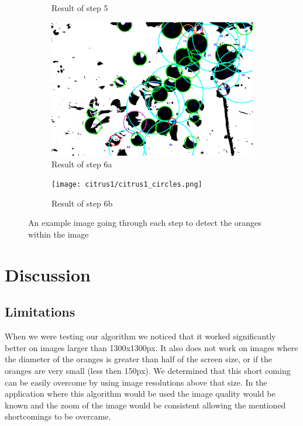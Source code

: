 \documentclass[conference]{IEEEtran}
\begin{document}
\begin{figure}
\begin{subfigure}{.33\linewidth}
  	\caption{Result of step 5}
  \end{subfigure}\par\medskip
  \begin{subfigure}{.5\linewidth}
  	\includegraphics[width=\linewidth]{citrus1/citrus1_circles_mask.png}\hfill
	   	\caption{Result of step 6a}
  \end{subfigure}
  \begin{subfigure}{.5\linewidth}
  	\texttt{[image: citrus1/citrus1\_circles.png]}\hfill
 	 \caption{Result of step 6b}
  \end{subfigure}
  \caption{An example image going through each step to detect the oranges within the image }
\end{figure}


\section{Discussion}

\subsection{Limitations}

When we were testing our algorithm we noticed that it worked significantly better on images larger than 1300x1300px. It also does not work on images where the diameter of the oranges is greater than half of the screen size, or if the oranges are very small (less then 150px). We determined that this short coming can be easily overcome by using image resolutions above that size. In the application where this algorithm would be used the image quality would be known and the zoom of the image would be consistent allowing the mentioned shortcomings to be overcame. 
\end{document}
